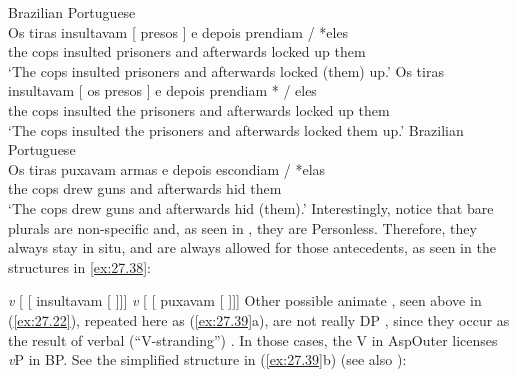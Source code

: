 \documentclass[output=paper]{langsci/langscibook}
\begin{document}
\ea\label{ex:27.36} Brazilian Portuguese\\
    \ea
        \gll Os   tiras    insultavam [ presos ] e depois prendiam \underline{\hphantom{eles}} / *eles\\
          the   cops   insulted {} prisoners {} and   afterwards {locked up} {} {} \hphantom{*}them\\
        \glt  `The cops insulted prisoners and afterwards locked (them) up.'
    \ex
        \gll Os   tiras   insultavam   [ os presos ] e depois prendiam *\underline{\hphantom{eles}} / eles\\
           the  cops  insulted {} the prisoners {} and afterwards {locked up} {} {} them\\
        \glt `The cops insulted the prisoners and afterwards locked them up.'
    \z
\ex\label{ex:27.37} Brazilian Portuguese\\
    \gll Os   tiras    puxavam \ob{} armas \cb{} e depois escondiam \underline{\hphantom{elas}} / *elas\\
        the   cops   drew       {} guns {}       and   afterwards hid {} {} \hphantom{*}them\\
    \glt `The cops drew guns and afterwards hid (them).'
\z
Interestingly, notice that bare plurals are non-specific and, as seen in
, they are Personless. Therefore, they always stay in situ,
and  are always allowed for those antecedents, as seen in the
structures in \eqref{ex:27.38}:

\ea\label{ex:27.38}
    \ea \emph{v} [ [ insultavam [
      ]]]
        \vspace{2em}
    \ex \emph{v} [ [ puxavam [
      ]]]
        \vspace{2em}
    \z
\z
Other possible animate , seen above in (\ref{ex:27.22}),
repeated here as (\ref{ex:27.39}a), are not really DP , since they
occur as the result of verbal (\enquote{V-stranding}) . In those cases,
the V in AspOuter licenses \emph{v}P  in BP\@. See the simplified
structure in (\ref{ex:27.39}b) (see also
\citealt{Cyrino2013,ReintgesCyrino2016}):
\end{document}
